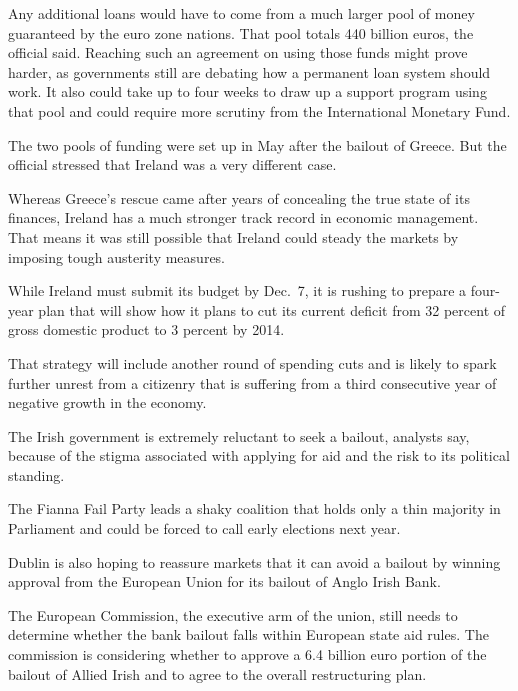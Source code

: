 ﻿\documentclass[12pt]{article}
\begin{document}
Any additional loans would have to come from a much larger pool of money guaranteed by the euro zone
nations. That pool totals 440 billion euros, the official said. Reaching such an agreement on using
those funds might prove harder, as governments still are debating how a permanent loan system should
work. It also could take up to four weeks to draw up a support program using that pool and could
require more scrutiny from the International Monetary Fund.

The two pools of funding were set up in May after the bailout of Greece. But the official stressed
that Ireland was a very different case.

Whereas Greece's rescue came after years of concealing the true state of its finances, Ireland has a
much stronger track record in economic management. That means it was still possible that Ireland
could steady the markets by imposing tough austerity measures.

While Ireland must submit its budget by Dec.~7, it is rushing to prepare a four-year plan that will
show how it plans to cut its current deficit from 32 percent of gross domestic product to 3 percent
by 2014.

That strategy will include another round of spending cuts and is likely to spark further unrest from
a citizenry that is suffering from a third consecutive year of negative growth in the economy.

The Irish government is extremely reluctant to seek a bailout, analysts say, because of the stigma
associated with applying for aid and the risk to its political standing.

The Fianna Fail Party leads a shaky coalition that holds only a thin majority in Parliament and
could be forced to call early elections next year.

Dublin is also hoping to reassure markets that it can avoid a bailout by winning approval from the
European Union for its bailout of Anglo Irish Bank.

The European Commission, the executive arm of the union, still needs to determine whether the bank
bailout falls within European state aid rules. The commission is considering whether to approve a
6.4 billion euro portion of the bailout of Allied Irish and to agree to the overall restructuring
plan.
\end{document}
